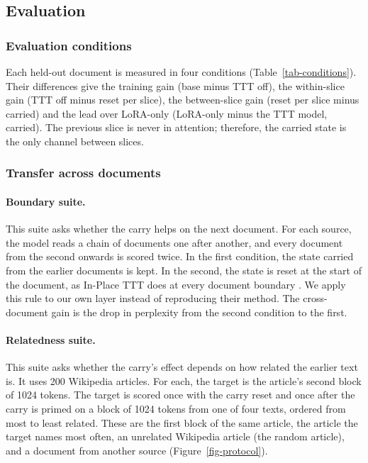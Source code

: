 \documentclass[10pt]{article} %
\begin{document}
\subsection{Evaluation}

\subsubsection{Evaluation conditions}

Each held-out document is measured in four conditions (Table~\ref{tab-conditions}). Their differences give the training gain (base minus TTT off), the within-slice gain (TTT off minus reset per slice), the between-slice gain (reset per slice minus carried) and the lead over LoRA-only (LoRA-only minus the TTT model, carried). The previous slice is never in attention; therefore, the carried state is the only channel between slices.

\subsubsection{Transfer across documents}
\paragraph{Boundary suite.} This suite asks whether the carry helps on the next document. For each source, the model reads a chain of documents one after another, and every document from the second onwards is scored twice. In the first condition, the state carried from the earlier documents is kept. In the second, the state is reset at the start of the document, as In-Place TTT does at every document boundary \citep{feng2026inplace}. We apply this rule to our own layer instead of reproducing their method. The cross-document gain is the drop in perplexity from the second condition to the first.

\paragraph{Relatedness suite.} This suite asks whether the carry's effect depends on how related the earlier text is. It uses 200 Wikipedia articles. For each, the target is the article's second block of 1024 tokens. The target is scored once with the carry reset and once after the carry is primed on a block of 1024 tokens from one of four texts, ordered from most to least related. These are the first block of the same article, the article the target names most often, an unrelated Wikipedia article (the random article), and a document from another source (Figure~\ref{fig-protocol}).
\end{document}
